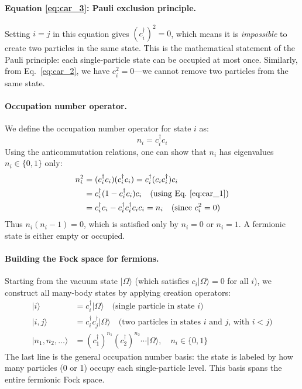 \documentclass[12pt,oneside,openright]{report}
\theoremstyle{definition}
\theoremstyle{plain}
\theoremstyle{remark}
\begin{document}
\paragraph{Equation \eqref{eq:car_3}: Pauli exclusion principle.}
Setting $i=j$ in this equation gives $(c_i^\dagger)^2 = 0$, which means it is \emph{impossible} 
to create two particles in the same state. This is the mathematical statement of the Pauli principle: 
each single-particle state can be occupied at most once. Similarly, from Eq.~\eqref{eq:car_2}, 
we have $c_i^2 = 0$—we cannot remove two particles from the same state.

\paragraph{Occupation number operator.}
We define the occupation number operator for state $i$ as:
\begin{equation}
n_i = c_i^\dagger c_i
\end{equation}
Using the anticommutation relations, one can show that $n_i$ has eigenvalues $n_i \in \{0,1\}$ only:
\begin{align}
n_i^2 &= (c_i^\dagger c_i)(c_i^\dagger c_i) = c_i^\dagger (c_i c_i^\dagger) c_i \nonumber\\
&= c_i^\dagger (1 - c_i^\dagger c_i) c_i \quad \text{(using Eq.~\eqref{eq:car_1})} \nonumber\\
&= c_i^\dagger c_i - c_i^\dagger c_i^\dagger c_i c_i = n_i \quad \text{(since } c_i^2 = 0\text{)}
\end{align}
Thus $n_i(n_i - 1) = 0$, which is satisfied only by $n_i = 0$ or $n_i = 1$. A fermionic state 
is either empty or occupied.

\paragraph{Building the Fock space for fermions.}
Starting from the vacuum state $|\Omega\rangle$ (which satisfies $c_i|\Omega\rangle = 0$ for all $i$), 
we construct all many-body states by applying creation operators:
\begin{align}
|i\rangle &= c_i^\dagger |\Omega\rangle \quad \text{(single particle in state $i$)} \\
|i,j\rangle &= c_i^\dagger c_j^\dagger |\Omega\rangle \quad \text{(two particles in states $i$ and $j$, with $i<j$)} \\
|n_1, n_2, \ldots\rangle &= (c_1^\dagger)^{n_1} (c_2^\dagger)^{n_2} \cdots |\Omega\rangle, \quad n_i \in \{0,1\}
\end{align}
The last line is the general occupation number basis: the state is labeled by how many particles 
(0 or 1) occupy each single-particle level. This basis spans the entire fermionic Fock space.
\end{document}

